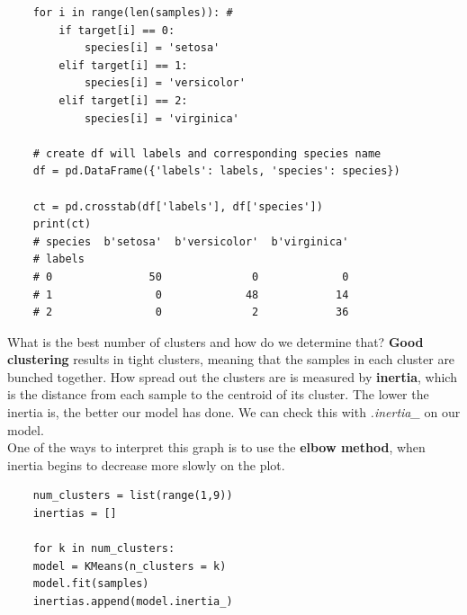 \documentclass[11pt, a4paper]{article}
\begin{document}
\begin{spacing}{1.1}
\begin{lstlisting}
	for i in range(len(samples)): # 
		if target[i] == 0:
			species[i] = 'setosa'
		elif target[i] == 1:
			species[i] = 'versicolor'
		elif target[i] == 2: 
			species[i] = 'virginica'

	# create df will labels and corresponding species name
	df = pd.DataFrame({'labels': labels, 'species': species})
	
	ct = pd.crosstab(df['labels'], df['species'])
	print(ct)
	# species  b'setosa'  b'versicolor'  b'virginica'
	# labels                                         
	# 0               50              0             0
	# 1                0             48            14
	# 2                0              2            36 \end{lstlisting} \vspace*{1mm}
	What is the best number of clusters and how do we determine that? \textbf{Good clustering} results in tight clusters, meaning that the samples in each cluster are bunched together. How spread out the clusters are is measured by \textbf{inertia}, which is the distance from each sample to the centroid of its cluster. The lower the inertia is, the better our model has done. We can check this with \textit{.inertia\_} on our model. \vspace*{1mm} \\
	One of the ways to interpret this graph is to use the \textbf{elbow method}, when inertia begins to decrease more slowly on the plot. \\
	\begin{minipage}[c]{9cm}
	\begin{lstlisting}
	num_clusters = list(range(1,9))
	inertias = []
	
	for k in num_clusters:
	model = KMeans(n_clusters = k)
	model.fit(samples)
	inertias.append(model.inertia_)
	

\end{lstlisting}
\end{minipage}
\end{spacing}
\end{document}
